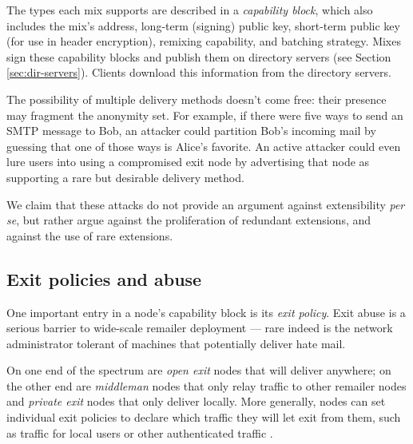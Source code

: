 \documentclass[11pt]{IEEEtran}
\begin{document}
The types each mix supports are described in a \emph{capability block},
which also includes the mix's address, long-term (signing) public key,
short-term public key (for use in header encryption), remixing capability,
and batching strategy. Mixes sign these capability blocks
and publish them on directory servers (see Section \ref{sec:dir-servers}).
Clients download this information from the directory servers.

%

The possibility of multiple delivery methods doesn't come free: their
presence may fragment the anonymity set.  For example, if there were five
ways to send an SMTP message to Bob, an attacker could partition Bob's
incoming mail by guessing that one of those ways is Alice's favorite.
An active attacker could even lure users into using a compromised
exit node by advertising that node as supporting a
rare but desirable delivery method.

We claim that these attacks do not provide an argument against
extensibility \emph{per se}, but rather argue against the proliferation
of redundant extensions, and against the use of rare extensions.  

\subsection{Exit policies and abuse}
\label{subsec:exitpolicies}

One important entry in a node's capability block is its \emph{exit
policy}. Exit abuse is a serious barrier to wide-scale remailer deployment
--- rare indeed is the network administrator tolerant of machines that
potentially deliver hate mail. %

On one end of the spectrum are \emph{open exit} nodes that will
deliver anywhere; on the other end are \emph{middleman} nodes that
only relay traffic to other remailer nodes and \emph{private exit}
nodes that only deliver locally. More generally, nodes can set
individual exit policies to declare which traffic they will let exit
from them, such as traffic for local users or other authenticated
traffic \cite{onion-discex00}.
\end{document}
